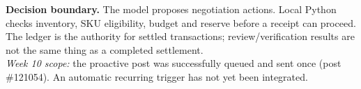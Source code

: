 \documentclass[10pt,a4paper]{article}
\begin{document}
\noindent\textbf{Decision boundary.}
The model proposes negotiation actions. Local Python checks inventory, SKU eligibility, budget and reserve before a receipt can proceed. The ledger is the authority for settled transactions; review/verification results are not the same thing as a completed settlement.\\[6pt]
\noindent\textit{Week 10 scope:} the proactive post was successfully queued and sent once (post \#121054). An automatic recurring trigger has not yet been integrated.
\end{document}
